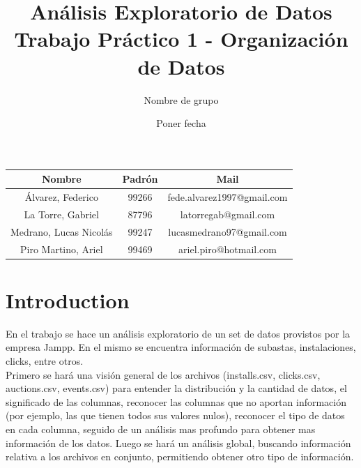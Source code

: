 \documentclass{article}
\title{Análisis Exploratorio de Datos \\ Trabajo Práctico 1 - Organización de Datos}
\author{Nombre de grupo}
\date{Poner fecha}
\newcommand\tab[1][1cm]{\hspace*{#1}}
\begin{document}
\begin{figure}
    \centering
\end{figure}

\maketitle

\FloatBarrier
\begin{center}
        \begin{tabular}{ |c|c|c| }
          \hline
          Nombre & Padrón & Mail \\
          \hline\hline
          Álvarez, Federico & 99266 & fede.alvarez1997@gmail.com \\
          \hline
          La Torre, Gabriel & 87796 & latorregab@gmail.com \\
          \hline
          Medrano, Lucas Nicolás & 99247 & lucasmedrano97@gmail.com \\
          \hline
          Piro Martino, Ariel & 99469 & ariel.piro@hotmail.com \\
          \hline
        \end{tabular}
\end{center}
\FloatBarrier

\newpage

\tableofcontents
\newpage
\section{Introduction}
	\tab En el trabajo se hace un análisis exploratorio de un set de datos provistos por la empresa Jampp. En el mismo se encuentra información de subastas, instalaciones, clicks, entre otros.\\
	\tab Primero se hará una visión general de los archivos (installs.csv, clicks.csv, auctions.csv, events.csv) para entender la distribución y la cantidad de datos, el significado de las columnas, reconocer las columnas que no aportan información (por ejemplo, las que tienen todos sus valores nulos), reconocer el tipo de datos en cada columna, seguido de un análisis mas profundo para obtener mas información de los datos. Luego se hará un análisis global, buscando información relativa a los archivos en conjunto, permitiendo obtener otro tipo de información.
\end{document}

